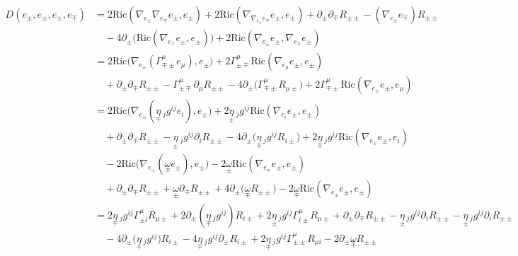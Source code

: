 \documentclass[a4paper,11pt]{article}
\numberwithin{equation}{section}
\theoremstyle{definition}
\newcommand{\R}{{\mathrm{Ric}}}
\begin{document}
\begin{align*}
    \!\!\!\!\!\!\!\!\!\!\!\!\!\!\!
    D(e_\pm,e_\pm, e_\pm, e_\mp) 
    &=2 \R(\nabla_{e_\pm}\nabla_{{e_\mp}} e_\pm ,e_\pm )
    + 2 \R(\nabla_{\nabla_{e_\pm}{e_\mp}} e_\pm ,e_\pm )
    + \partial_\pm\partial_\mp R_{\pm\pm}
    -(\nabla_{e_\pm} {e_\mp})R_{\pm\pm}\\
    & \quad
    -4 \partial_\pm\big(\R(\nabla_{{e_\mp}} e_\pm , e_\pm )\big)
    + 2 \R(\nabla_{e_\pm} e_\pm , \nabla_{{e_\mp}} e_\pm )\\
    &=2 \R\big(\nabla_{e_\pm}(\Gamma_{\mp\pm}^\mu e_\mu) ,e_\pm \big)
    + 2 \Gamma_{\pm\mp}^\mu\R(\nabla_{e_\mu} e_\pm ,e_\pm )\\
    & \quad + \partial_\pm\partial_\mp R_{\pm\pm}
    -\Gamma_{\pm\mp}^\mu \partial_\mu R_{\pm\pm}
    -4 \partial_\pm\big(\Gamma_{\mp\pm}^\mu R_{\mu\pm}\big)
     + 2 \Gamma_{\mp\pm}^\mu \R(\nabla_{e_\pm} e_\pm , e_\mu ) \\
    &=2 \R\big(\nabla_{e_\pm}(\underset{\mp}{\eta}\,_j g^{ij} e_i) ,e_\pm \big)
    + 2 \underset{\pm}{\eta}\,_j g^{ij} \R(\nabla_{e_i } e_\pm ,e_\pm )\\
    & \quad + \partial_\pm\partial_\mp R_{\pm\pm}
    -\underset{\pm}{\eta}\,_j g^{ij}  \partial_i  R_{\pm\pm}
    -4 \partial_\pm\big(\underset{\mp}{\eta}\,_j g^{ij}  R_{i \pm}\big)
     + 2 \underset{\mp}{\eta}\,_j g^{ij}  \R(\nabla_{e_\pm} e_\pm , e_i  ) \\
    & \quad - 2 \R\big(\nabla_{e_\pm}(\underset{\mp}{\omega} e_\pm) ,e_\pm \big)
    - 2 \underset{\pm}{\omega}\R(\nabla_{e_\mp} e_\pm ,e_\pm )\\
    & \quad + \partial_\pm\partial_\mp R_{\pm\pm}
    +\underset{\pm}{\omega} \partial_\mp R_{\pm\pm}
    +4 \partial_\pm\big(\underset{\mp}{\omega} R_{\pm\pm}\big)
     - 2 \underset{\mp}{\omega} \R(\nabla_{e_\pm} e_\pm , e_\pm ) \\
    &=2 \underset{\mp}{\eta}\,_j g^{ij} \Gamma_{\pm i}^\mu R_{\mu\pm}
    + 2 \partial_\pm(\underset{\mp}{\eta}\,_j g^{ij}) R_{i\pm}
    + 2 \underset{\pm}{\eta}\,_j g^{ij} \Gamma_{i \pm}^\mu R_{\mu\pm}
    + \partial_\pm\partial_\mp R_{\pm\pm} 
    -\underset{\pm}{\eta}\,_j g^{ij}  \partial_i  R_{\pm\pm}
    -\underset{\pm}{\eta}\,_j g^{ij}  \partial_i  R_{\pm\pm}\\
    & \quad
    -4 \partial_\pm\big(\underset{\mp}{\eta}\,_j g^{ij} \big) R_{i \pm}
    -4 \underset{\mp}{\eta}\,_j g^{ij} \partial_\pm R_{i \pm}
     + 2 \underset{\mp}{\eta}\,_j g^{ij} \Gamma_{\pm\pm}^\mu R_{\mu i}
    - 2 \partial_\pm\underset{\mp}{\omega}  R_{\pm\pm}

\end{align*}
\end{document}
